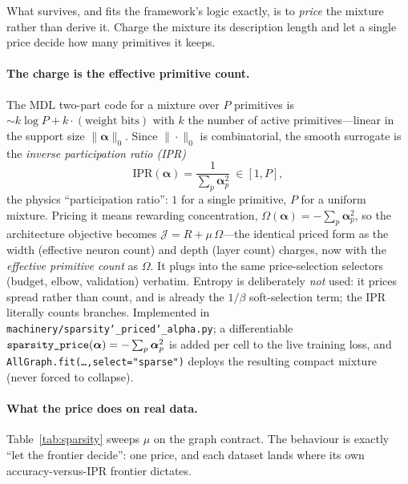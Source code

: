 \documentclass[11pt]{article}
\newcommand{\allowbreakhere}{\discretionary{}{}{}}
\newcommand{\code}[1]{\texttt{\def\_{\char`_\allowbreakhere}#1}}
\newcommand{\alphapar}{\bm{\alpha}}
\begin{document}
What survives, and fits the framework's logic exactly, is to \emph{price} the mixture rather than derive
it. Charge the mixture its description length and let a single price decide how many primitives it keeps.

\paragraph{The charge is the effective primitive count.} The MDL two-part code for a mixture over $P$
primitives is $\sim k\log P + k\cdot(\text{weight bits})$ with $k$ the number of active primitives---linear
in the support size $\|\alphapar\|_0$. Since $\|\cdot\|_0$ is combinatorial, the smooth
surrogate is the \emph{inverse participation ratio (IPR)}
\begin{equation}
\mathrm{IPR}(\alphapar)=\frac{1}{\sum_p\alphapar_p^{2}}\ \in[1,P],
\label{eq:ipr}
\end{equation}
the physics ``participation ratio'': $1$ for a single primitive, $P$ for a uniform mixture. Pricing it means
rewarding concentration, $\Omega(\alphapar)=-\sum_p\alphapar_p^{2}$, so the architecture objective becomes
$\mathcal J=R+\mu\,\Omega$---the identical priced form as the width (effective neuron count) and depth
(layer count) charges, now with the \emph{effective primitive count} as $\Omega$. It plugs into the same
price-selection selectors (budget, elbow, validation) verbatim. Entropy is deliberately \emph{not} used: it
prices spread rather than count, and is already the $1/\beta$ soft-selection term; the IPR literally counts
branches. Implemented in \code{machinery/sparsity\_priced\_alpha.py}; a differentiable
$\code{sparsity\_price}(\alphapar)=-\sum_p\alphapar_p^{2}$ is added per cell to the live training loss, and
\code{AllGraph.fit(\ldots,select="sparse")} deploys the resulting compact mixture (never forced to collapse).

\paragraph{What the price does on real data.} Table~\ref{tab:sparsity} sweeps $\mu$ on the graph contract.
The behaviour is exactly ``let the frontier decide'': one price, and each dataset lands where its own
accuracy-versus-IPR frontier dictates.
\end{document}
